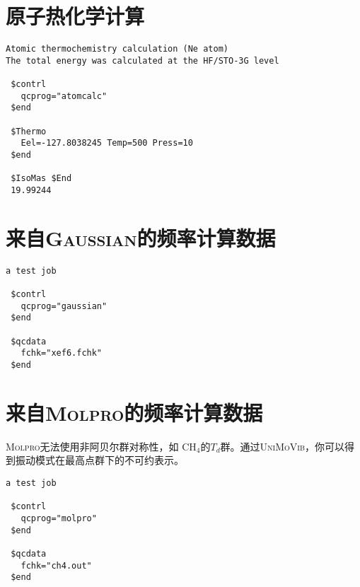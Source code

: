 \documentclass[12pt,a4paper,openany,twoside,cap,UTF8]{ctexbook}
\begin{document}
\section{原子热化学计算} \label{sec:exp1}

\begin{colorboxed}[oval=false,boxcolor=blue!75!black,bgcolor=blue!5!white]
\ttfamily\footnotesize
\begin{lstlisting}
Atomic thermochemistry calculation (Ne atom)
The total energy was calculated at the HF/STO-3G level

 $contrl
   qcprog="atomcalc"
 $end

 $Thermo
   Eel=-127.8038245 Temp=500 Press=10
 $end

 $IsoMas $End
 19.99244
\end{lstlisting}\end{colorboxed}

\section{来自\textsc{Gaussian}的频率计算数据} \label{sec:exp2}

\begin{colorboxed}[oval=false,boxcolor=blue!75!black,bgcolor=blue!5!white]
\ttfamily\footnotesize
\begin{lstlisting}
a test job

 $contrl
   qcprog="gaussian"
 $end

 $qcdata
   fchk="xef6.fchk"
 $end
\end{lstlisting}\end{colorboxed}

\section{来自\textsc{Molpro}的频率计算数据} \label{sec:exp3}

\textsc{Molpro}无法使用非阿贝尔群对称性，如 CH$_4$的$T_d$群。通过\textsc{UniMoVib}，你可以得到振动模式在最高点群下的不可约表示。

\begin{colorboxed}[oval=false,boxcolor=blue!75!black,bgcolor=blue!5!white]
\ttfamily\footnotesize
\begin{lstlisting}
a test job

 $contrl
   qcprog="molpro"
 $end

 $qcdata
   fchk="ch4.out"
 $end
\end{lstlisting}\end{colorboxed}
\end{document}
